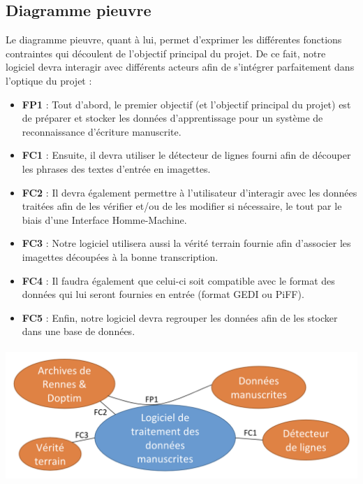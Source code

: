 \subsection{Diagramme pieuvre}

Le diagramme pieuvre, quant à lui, permet d’exprimer les différentes fonctions contraintes
qui découlent de l’objectif principal du projet. De ce fait, notre logiciel devra interagir
avec différents acteurs afin de s’intégrer parfaitement dans l’optique du projet :

\begin{itemize}
\item \textbf{FP1} : Tout d’abord, le premier objectif (et l’objectif principal du projet) est
de préparer et stocker les données d’apprentissage pour un système de reconnaissance d’écriture manuscrite.
\item \textbf{FC1} : Ensuite, il devra utiliser le détecteur de lignes fourni afin de découper
les phrases des textes d’entrée en imagettes. 
\item \textbf{FC2} : Il devra également permettre à l’utilisateur d’interagir avec les données
traitées afin de les vérifier et/ou de les modifier si nécessaire, le tout par le biais d’une Interface Homme-Machine. 
\item \textbf{FC3} : Notre logiciel utilisera aussi la vérité terrain fournie afin d’associer
les imagettes découpées à la bonne transcription.
\item \textbf{FC4} : Il faudra également que celui-ci soit compatible avec le format des données
qui lui seront fournies en entrée (format GEDI ou PiFF).
\item \textbf{FC5} : Enfin, notre logiciel devra regrouper les données afin de les stocker dans une base de données.
\end{itemize}

\paragraph{}
\begin{mdframed}
\begin{center}
\includegraphics[width=0.7\linewidth]{pieuvre.png}
\end{center}
\end{mdframed}